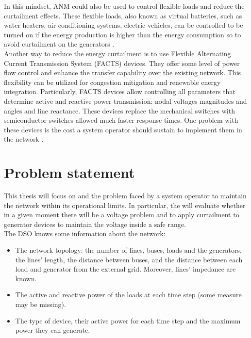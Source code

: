 In this mindset, \gls{ANM} could also be used to control flexible loads and reduce the curtailment effects. These flexible loads, also known as virtual batteries, such as water heaters, air conditioning systems, electric vehicles, can be controlled to be turned on if the energy production is higher than the energy consumption so to avoid curtailment on the generators \cite{flexibleloads}. \\
Another way to reduce the energy curtailment is to use Flexible Alternating Current Transmission System (\gls{FACTS}) devices. They offer some
level of power flow control and enhance the transfer capability over the existing network. This flexibility can be utilized for congestion
mitigation and renewable energy integration. Particularly, \gls{FACTS} devices allow controlling all parameters that determine active and reactive power transmission: nodal voltages magnitudes and angles and line reactance. These devices replace the mechanical switches with semiconductor switches allowed much faster response times. One problem with these devices is the cost a system operator should sustain to implement them in the network \cite{facts}.

\section{Problem statement}
This thesis will focus on  and the problem faced by a system operator to maintain the network within its operational limits. In particular, the  will evaluate whether in a given moment there will be a voltage problem and to apply curtailment to generator devices to maintain the voltage inside a safe range.\\

The \gls{DSO} knows some information about the network: 
\begin{itemize}
    \item The network topology: the number of lines, buses, loads and the generators, the lines' length, the distance between buses, and the distance between each load and generator from the external grid. Moreover, lines' impedance are known.
    \item The active and reactive power of the loads at each time step (some measure may be missing).
    \item The type of  device, their active power for each time step and the maximum power they can generate.
\end{itemize}

